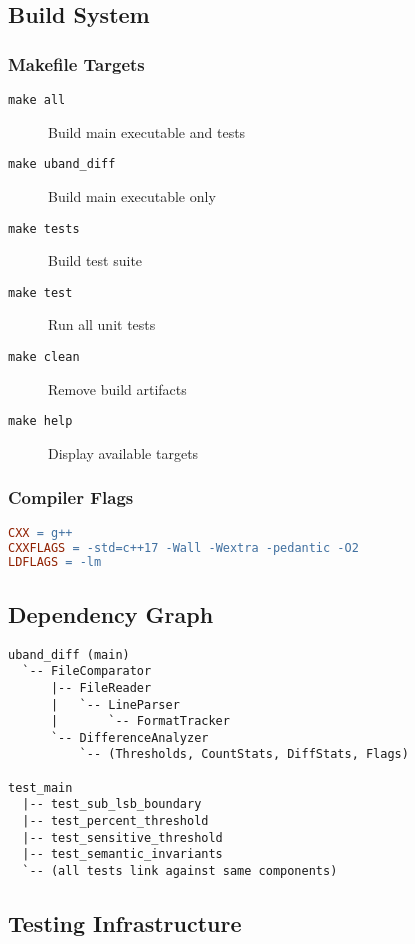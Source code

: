 \subsection{Build System}

\subsubsection{Makefile Targets}

\begin{description}
    \item[\texttt{make all}] Build main executable and tests
    \item[\texttt{make uband\_diff}] Build main executable only
    \item[\texttt{make tests}] Build test suite
    \item[\texttt{make test}] Run all unit tests
    \item[\texttt{make clean}] Remove build artifacts
    \item[\texttt{make help}] Display available targets
\end{description}

\subsubsection{Compiler Flags}

\begin{lstlisting}[language=make]
CXX = g++
CXXFLAGS = -std=c++17 -Wall -Wextra -pedantic -O2
LDFLAGS = -lm
\end{lstlisting}

\subsection{Dependency Graph}

\begin{verbatim}
uband_diff (main)
  `-- FileComparator
      |-- FileReader
      |   `-- LineParser
      |       `-- FormatTracker
      `-- DifferenceAnalyzer
          `-- (Thresholds, CountStats, DiffStats, Flags)

test_main
  |-- test_sub_lsb_boundary
  |-- test_percent_threshold
  |-- test_sensitive_threshold
  |-- test_semantic_invariants
  `-- (all tests link against same components)
\end{verbatim}

\subsection{Testing Infrastructure}


